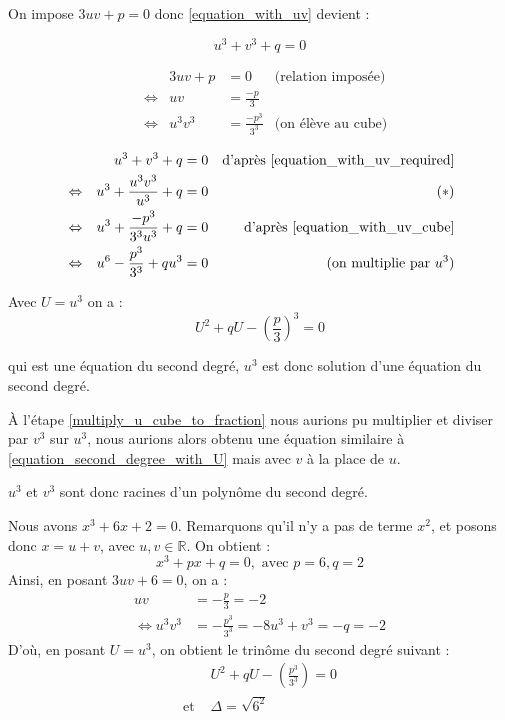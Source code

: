 \documentclass[]{../templates/homework}
\begin{document}
	\question On impose $3uv + p = 0$ donc \eqref{equation_with_uv} devient :
	
	\begin{equation*}
		u^3 + v^3 + q = 0 \tag{$E_3$} \label{equation_with_uv_required}
	\end{equation*}
	
	\question
	
	\begin{align*}
		&                 & 3uv + p & = 0                & \text{(relation imposée)}                                           \\
		& \Leftrightarrow & uv      & = \frac{-p}{3}     &                                                                     \\
		& \Leftrightarrow & u^3v^3  & = \frac{-p^3}{3^3} & \text{(on élève au cube)} \tag{$E_4$} \label{equation_with_uv_cube}
	\end{align*}
	
	\question
	
	\begin{align*}
		&                 & u^3 + v^3 + q                 & = 0 & \text{d'après \eqref{equation_with_uv_required}} \\
		& \Leftrightarrow & u^3 + \frac{u^3v^3}{u^3} + q  & = 0 & \tag{$\ast$} \label{multiply_u_cube_to_fraction} \\
		& \Leftrightarrow & u^3 + \frac{-p^3}{3^3u^3} + q & = 0 & \text{d'après \eqref{equation_with_uv_cube}}     \\
		& \Leftrightarrow & u^6 - \frac{p^3}{3^3} + qu^3  & = 0 & \text{(on multiplie par $u^3$)}
	\end{align*}
	
	Avec $U = u^3$ on a :
	\begin{equation}
		\tag{$E_5$}
		U^2 + qU - \left(\frac{p}{3}\right)^3 = 0
		\label{equation_second_degree_with_U}
	\end{equation}
	
	qui est une équation du second degré, $u^3$ est donc solution d'une équation du second degré.
	
	À l'étape \eqref{multiply_u_cube_to_fraction} nous aurions pu multiplier et diviser par $v^3$ sur $u^3$, nous aurions alors obtenu une équation similaire à \eqref{equation_second_degree_with_U} mais avec $v$ à la place de $u$.
	
	$u^3$ et $v^3$ sont donc racines d'un polynôme du second degré.
	
	Nous avons $x^3 + 6x + 2 =0$. Remarquons qu'il n'y a pas de terme $x^2$, et posons donc $x = u+v$, avec  $u,v \in \mathbb R$. On obtient :
	$$x^3 + px + q = 0, \text{ avec } p=6, q=2$$
	Ainsi, en posant $3uv + 6 = 0$, on a :
	\begin{align*}
		uv &= -\frac{p}{3} = -2 \\
		\iff u^3v^3 &= -\frac{p^3}{3^3}= -8
		u^3 + v^3 = -q = -2
	\end{align*}
	D'où, en posant $U = u^3$, on obtient le trinôme du second degré suivant : 
	\begin{align*}
		&U^2 + qU - \left(\frac{p^3}{3^3}\right)=0 \\
		\text{et } &\Delta = \sqrt{6^2}
	\end{align*}
	
\end{document}
